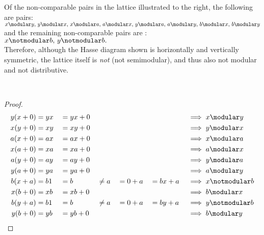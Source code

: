 \begin{minipage}{\tw-33mm}
\begin{example}
\label{ex:latm_6_smod1}
Of the non-comparable pairs in the lattice illustrated to the right,
the following are  pairs:
\\\indentx$ x\modular y,\, y\modular x,\, x\modular a,\, a\modular x,\, y\modular a,\, a\modular y,\, b\modular x,\, b\modular y$
\\and the remaining non-comparable pairs are :
\\\indentx$ x\notmodular b,\, y\notmodular b.$
\\
Therefore, although the Hasse diagram shown is horizontally and vertically symmetric,
the lattice itself is \emph{not}  (not semimodular),
and thus also not modular and not distributive.
\end{example}
\end{minipage}%
\hfill{}\hfill\mbox{}\\%
\begin{proof}
\begin{align*}
  y(x+0) &= yx &&= yx+0 &&        &&      &&       &&\implies x\modular y \\
  x(y+0) &= xy &&= xy+0 &&        &&      &&       &&\implies y\modular x \\
  a(x+0) &= ax &&= ax+0 &&        &&      &&       &&\implies x\modular a \\
  x(a+0) &= xa &&= xa+0 &&        &&      &&       &&\implies a\modular x \\
  a(y+0) &= ay &&= ay+0 &&        &&      &&       &&\implies y\modular a \\
  y(a+0) &= ya &&= ya+0 &&        &&      &&       &&\implies a\modular y \\
  b(x+a) &= b1 &&= b    &&\ne  a &&= 0+a &&= bx+a &&\implies x\notmodular b \\
  x(b+0) &= xb &&= xb+0 &&        &&      &&       &&\implies b\modular x \\
  b(y+a) &= b1 &&= b    &&\ne  a &&= 0+a &&= by+a &&\implies y\notmodular b \\
  y(b+0) &= yb &&= yb+0 &&        &&      &&       &&\implies b\modular y    
\end{align*}
\end{proof}


